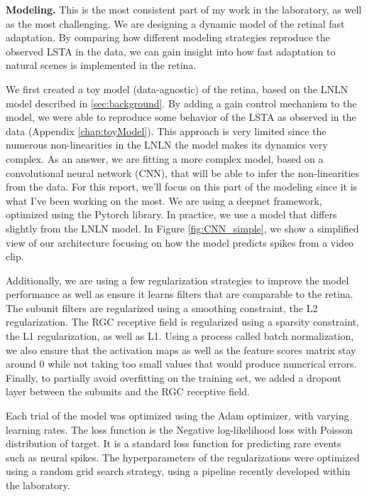 
\textbf{Modeling.} This is the most consistent part of my work in the
laboratory, as well as the
most challenging. We are designing a dynamic model of the retinal fast
adaptation.
By comparing how different modeling strategies reproduce the
observed LSTA in the data, we can gain insight into how fast adaptation to
natural scenes is implemented in the retina.

We first created a toy model (data-agnostic) of the retina, based on the LNLN
model described
in \ref{sec:background}. By adding a gain control mechanism to the model, we
were able to reproduce some behavior of the LSTA as observed in the data
(Appendix \ref{chap:toyModel}).
This approach is very limited since the numerous non-linearities in the LNLN
the model makes its dynamics very complex.
As an answer, we are fitting a more complex model, based on a convolutional
neural network (CNN), that will be able to infer the non-linearities from the
data. For this report, we'll focus on this part of the modeling since it is
what I've been working on the most.
We are using a deepnet framework, optimized using the
Pytorch library. In practice, we use a model that differs slightly from the
LNLN
model. In Figure \ref{fig:CNN_simple}, we show a simplified view of our
architecture focusing on how the model predicts spikes from a video clip.

Additionally, we are using a few regularization strategies to improve the model
performance as well as ensure it learns filters that are comparable to the
retina. %
The subunit filters are regularized using a smoothing constraint, the L2
regularization. The RGC receptive field is regularized using a sparsity
constraint, the L1 regularization, as well as L1. Using a process called batch
normalization, we also ensure that the activation maps as well as the feature
scores matrix stay around 0 while not taking too small values that would
produce numerical errors. Finally, to partially avoid overfitting on the
training set, we added a dropout layer between the subunits and the RGC
receptive field.

Each trial of the model was optimized using the Adam optimizer, with varying
learning rates. The loss function is the Negative log-likelihood loss with
Poisson distribution of target. It is a standard loss function for predicting
rare events such as neural spikes.
The hyperparameters of the regularizations were optimized using a random grid
search strategy, using a pipeline recently developed within the laboratory.

